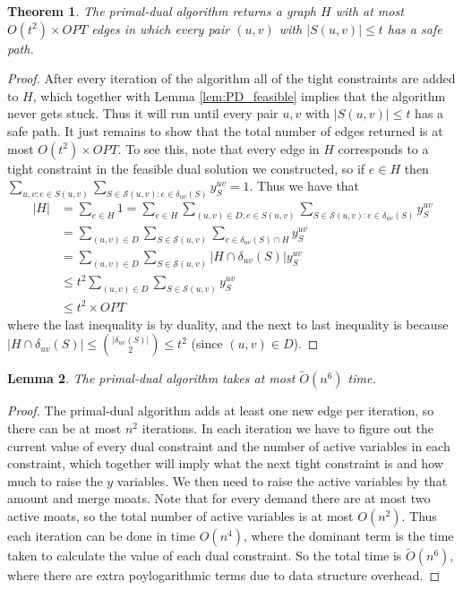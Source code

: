 \documentclass[11pt,letterpaper]{article}
\newtheorem{theorem}{Theorem}[section]
\newtheorem{lemma}[theorem]{Lemma}
\theoremstyle{definition}
\newcounter{note}[section]
\begin{document}
\begin{theorem} \label{thm:PD_main}
  The primal-dual algorithm returns a graph $H$ with at most $O(t^2)
  \times OPT$ edges in which every pair $(u,v)$ with $|S(u,v)| \leq t$
  has a safe path.
\end{theorem}
\begin{proof}
  After every iteration of the algorithm all of the tight constraints
  are added to $H$, which together with Lemma \ref{lem:PD_feasible}
  implies that the algorithm never gets stuck.  Thus it will run until
  every pair $u,v$ with $|S(u,v)| \leq t$ has a safe path.  It just
  remains to show that the total number of edges returned is at most
  $O(t^2) \times OPT$.  To see this, note that every edge in $H$
  corresponds to a tight constraint in the feasible dual solution we
  constructed, so if $e \in H$ then $\sum_{u,v : e \in S(u,v)} \sum_{S
    \in \mathcal{S}(u,v) : e \in \delta_{uv}(S)} y_S^{uv} = 1$.  Thus
  we have that
  \begin{align*}
    |H| &= \sum_{e \in H} 1 = \sum_{e \in H} \sum_{(u,v) \in D : e \in S(u,v)}
    \sum_{S \in \mathcal{S}(u,v) : e \in \delta_{uv}(S)} y_S^{uv} \\
    &= \sum_{(u,v) \in D} \sum_{S \in \mathcal{S}(u,v)} \sum_{e \in
      \delta_{uv}(S) \cap H} y_S^{uv} \\
    &= \sum_{(u,v) \in D} \sum_{S \in \mathcal{S}(u,v)} |H \cap
    \delta_{uv}(S)| y_S^{uv} \\
    & \leq t^2 \sum_{(u,v) \in D} \sum_{S \in \mathcal{S}(u,v)} y_S^{uv}
    \\
    & \leq t^2 \times OPT
  \end{align*}
  where the last inequality is by duality, and the next to last
  inequality is because $|H \cap \delta_{uv}(S)| \leq
  {|\delta_{uv}(S)| \choose 2} \leq t^2$ (since $(u,v) \in
  D$).
\end{proof}

\begin{lemma} \label{lem:PD_time}
The primal-dual algorithm takes at most $\tilde{O}(n^6)$ time.
\end{lemma}
\begin{proof}
The primal-dual algorithm adds at least one new edge per iteration, so there can be at most $n^2$ iterations.  In each iteration we have to figure out the current value of every dual constraint and the number of active variables in each constraint, which together will imply what the next tight constraint is and how much to raise the $y$ variables.  We then need to raise the active variables by that amount and merge moats.  Note that for every demand there are at most two active moats, so the total number of active variables is at most $O(n^2)$.  Thus each iteration can be done in time $O(n^4)$, where the dominant term is the time taken to calculate the value of each dual constraint.  So the total time is $\tilde{O}(n^6)$, where there are extra poylogarithmic terms due to data structure overhead.
\end{proof}
\end{document}
